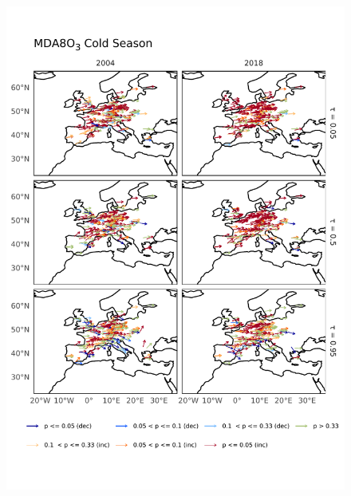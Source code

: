 \documentclass[journal abbreviation, manuscript]{copernicus}
\begin{document}
\begin{figure}[h!]
\centering
\includegraphics[height=\textheight]{figures/paper_figures/o3_map/o3_map_piecewise_stats_freeTau_mda8_anom_cold_eu_o3.pdf}
\caption{}
\label{fig:o3_map_eu_mda8_warm}
\end{figure}
\end{document}
